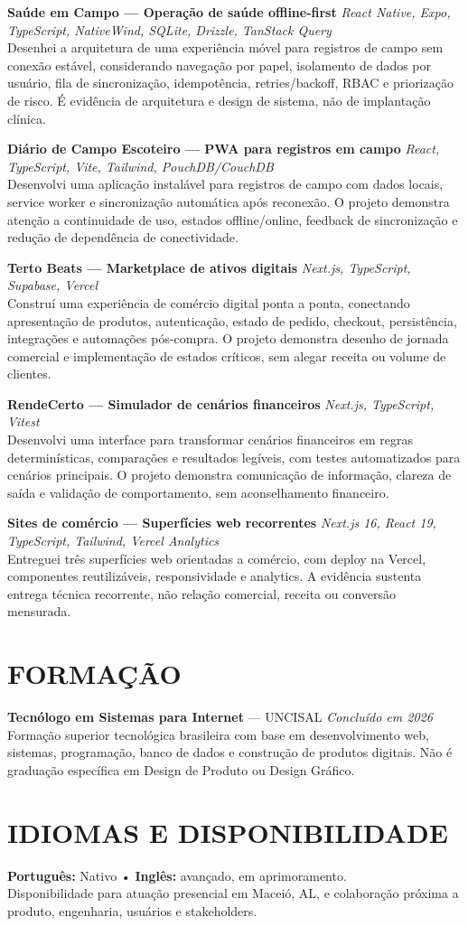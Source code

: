 \documentclass[10pt,a4paper]{article}
\begin{document}
\textbf{Saúde em Campo — Operação de saúde offline-first} \hfill \textit{React Native, Expo, TypeScript, NativeWind, SQLite, Drizzle, TanStack Query}\\
Desenhei a arquitetura de uma experiência móvel para registros de campo sem conexão estável, considerando navegação por papel, isolamento de dados por usuário, fila de sincronização, idempotência, retries/backoff, RBAC e priorização de risco. É evidência de arquitetura e design de sistema, não de implantação clínica.

\textbf{Diário de Campo Escoteiro — PWA para registros em campo} \hfill \textit{React, TypeScript, Vite, Tailwind, PouchDB/CouchDB}\\
Desenvolvi uma aplicação instalável para registros de campo com dados locais, service worker e sincronização automática após reconexão. O projeto demonstra atenção a continuidade de uso, estados offline/online, feedback de sincronização e redução de dependência de conectividade.

\textbf{Terto Beats — Marketplace de ativos digitais} \hfill \textit{Next.js, TypeScript, Supabase, Vercel}\\
Construí uma experiência de comércio digital ponta a ponta, conectando apresentação de produtos, autenticação, estado de pedido, checkout, persistência, integrações e automações pós-compra. O projeto demonstra desenho de jornada comercial e implementação de estados críticos, sem alegar receita ou volume de clientes.

\textbf{RendeCerto — Simulador de cenários financeiros} \hfill \textit{Next.js, TypeScript, Vitest}\\
Desenvolvi uma interface para transformar cenários financeiros em regras determinísticas, comparações e resultados legíveis, com testes automatizados para cenários principais. O projeto demonstra comunicação de informação, clareza de saída e validação de comportamento, sem aconselhamento financeiro.

\textbf{Sites de comércio — Superfícies web recorrentes} \hfill \textit{Next.js 16, React 19, TypeScript, Tailwind, Vercel Analytics}\\
Entreguei três superfícies web orientadas a comércio, com deploy na Vercel, componentes reutilizáveis, responsividade e analytics. A evidência sustenta entrega técnica recorrente, não relação comercial, receita ou conversão mensurada.

\section*{FORMAÇÃO}
\textbf{Tecnólogo em Sistemas para Internet} — UNCISAL \hfill \textit{Concluído em 2026}\\
Formação superior tecnológica brasileira com base em desenvolvimento web, sistemas, programação, banco de dados e construção de produtos digitais. Não é graduação específica em Design de Produto ou Design Gráfico.

\section*{IDIOMAS E DISPONIBILIDADE}
\textbf{Português:} Nativo \quad • \quad \textbf{Inglês:} avançado, em aprimoramento.\\
Disponibilidade para atuação presencial em Maceió, AL, e colaboração próxima a produto, engenharia, usuários e stakeholders.
\end{document}
